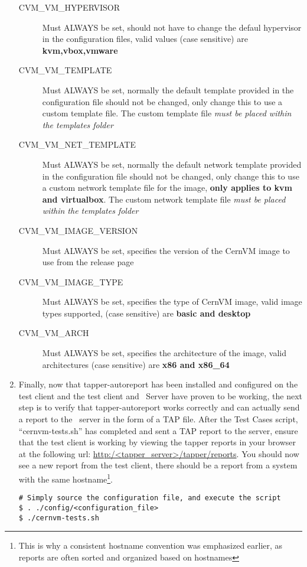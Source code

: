 \begin{enumerate}
\begin{description}
\item[CVM\_VM\_HYPERVISOR]	Must ALWAYS be set, should not have to change the defaul hypervisor in the configuration files, valid values 
							(case sensitive) are {\bf kvm,vbox,vmware}

\item[CVM\_VM\_TEMPLATE]		Must ALWAYS be set, normally the default template provided in the configuration file should not be changed,
								only change this to use a custom template file. The custom template file \emph{must be placed within the
								templates folder}

\item[CVM\_VM\_NET\_TEMPLATE]	Must ALWAYS be set, normally the default network template provided in the configuration file should not be
	 							changed, only change this to use a custom network template file for the \cernvm image,  {\bf only applies to kvm
	 							and virtualbox}. The custom network template file \emph{must be placed within the templates folder}

\item[CVM\_VM\_IMAGE\_VERSION]	Must ALWAYS be set, specifies the version of the CernVM image to use from the release page
	
\item[CVM\_VM\_IMAGE\_TYPE]		Must ALWAYS be set,  specifies the type of CernVM image, valid image types supported, (case sensitive) are 
								{\bf basic and desktop}

\item[CVM\_VM\_ARCH]		Must ALWAYS be set, specifies the architecture of the \cernvm image, valid architectures (case sensitive) are {\bf 
							x86 and x86\_64}
\end{description}	

\item	Finally, now that tapper-autoreport has been installed and configured on the test client and the test client and \tapper~Server
		have proven to be working, the next step is to verify that tapper-autoreport works correctly and can actually send a report to 	
		the \tapper~server in the form of a TAP file. After the \cernvm Test Cases script, ``cernvm-tests.sh'' has completed and sent
		a TAP report to the server, ensure that the test client is working by viewing the tapper reports in your browser at the 
		following url: \url{http:/<tapper\_server>/tapper/reports}. You should now see a new report from the test client, there should be a 
		report from a system with the same hostname\footnote{This is why a consistent hostname convention was emphasized earlier, as 
		reports are often sorted and organized based on hostnames}.

\lstset{language=bash,caption=Run \tapper-AutoReport for CernVM Test Cases}
\begin{lstlisting}
# Simply source the configuration file, and execute the script
$ . ./config/<configuration_file>
$ ./cernvm-tests.sh
\end{lstlisting}
\end{enumerate}